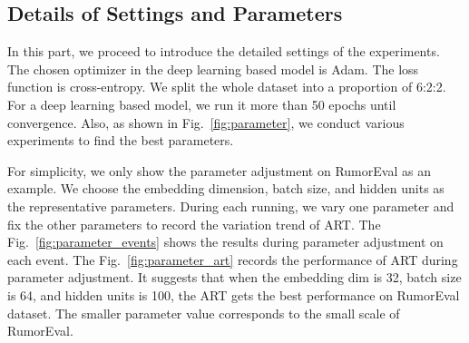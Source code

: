 \subsection{Details of Settings and Parameters}
In this part, we proceed to introduce the detailed settings of the experiments. The chosen optimizer in the deep learning based model is Adam. The loss function is cross-entropy. We split the whole dataset into a proportion of 6:2:2. For a deep learning based model, we  run it more than 50 epochs until convergence. Also, as shown in Fig.~\ref{fig:parameter}, we conduct various experiments to find the best parameters.

For simplicity, we only show the parameter adjustment on RumorEval as an example. We choose the embedding dimension, batch size, and hidden units as the representative parameters. During each running, we vary one parameter and fix the other parameters to record the variation trend of ART. The Fig.~\ref{fig:parameter_events} shows the results during parameter adjustment on each event. The Fig.~\ref{fig:parameter_art} records the performance of ART during parameter adjustment. It suggests that when the embedding dim is 32, batch size is 64, and hidden units is 100, the ART gets the best performance on RumorEval dataset. The smaller parameter value corresponds to the small scale of RumorEval.


